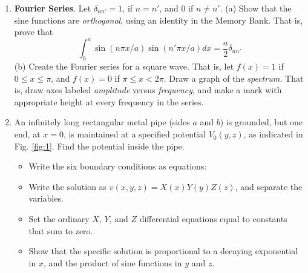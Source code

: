 \documentclass[10pt]{article}
\begin{document}
\begin{enumerate}
\item \textbf{Fourier Series}.  Let $\delta_{nn'} = 1$, if $n=n'$, and $0$ if $n\neq n'$.  (a) Show that the sine functions are \textit{orthogonal}, using an identity in the Memory Bank.  That is, prove that 
\begin{equation}
\int_0^a \sin(n\pi x/a) \sin(n'\pi x/a) dx = \frac{a}{2} \delta_{nn'}
\end{equation}
(b) Create the Fourier series for a square wave.  That is, let $f(x) = 1$ if $0 \leq x \leq \pi$, and $f(x) = 0$ if $\pi \leq x < 2\pi$.  Draw a graph of the \textit{spectrum.}  That is, draw axes labeled \textit{amplitude} versus \textit{frequency}, and make a mark with appropriate height at every frequency in the series. \\ \vspace{5cm}
\item An infinitely long rectangular metal pipe (sides $a$ and $b$) is grounded, but one end, at $x=0$, is maintained at a specified potential $V_0(y,z)$, as indicated in Fig. \ref{fig:1}.  Find the potential inside the pipe.
\begin{itemize}
\item Write the six boundary conditions as equations: \\ \vspace{1cm}
\item Write the solution as $v(x,y,z) = X(x) Y(y) Z(z)$, and separate the variables. \\ \vspace{2cm}
\item Set the ordinary $X$, $Y$, and $Z$ differential equations equal to constants that sum to zero. \\ \vspace{1cm}
\item Show that the specific solution is proportional to a decaying exponential in $x$, and the product of sine functions in $y$ and $z$.
\end{itemize}
\end{enumerate}
\end{document}
